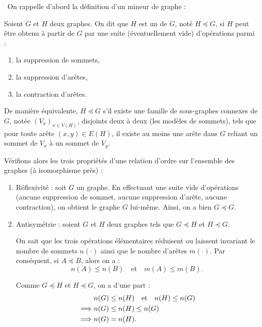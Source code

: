 \begin{td-sol}[]\,
    On rappelle d'abord la d\'efinition d'un mineur de graphe :
    \begin{definition}
        Soient \(G\) et \(H\) deux graphes. On dit que \(H\) est un  de \(G\), not\'e \(H \preccurlyeq G\), si \(H\) peut \^etre obtenu à partir de \(G\) par une suite (éventuellement vide) d'opérations parmi :
        \begin{enumerate}[label=\roman*)]
            \item la suppression de sommets,
            \item la suppression d'arêtes,
            \item la contraction d'arêtes.
        \end{enumerate}
    \end{definition}
    \vspace{2mm}

    De mani\`ere équivalente, \(H \preccurlyeq G\) s'il existe une famille de sous-graphes connexes de \(G\), not\'ee \((V_x)_{x \in V(H)}\), disjoints deux à deux (les modèles de sommets), tels que pour toute arête \((x, y) \in E(H)\), il existe au moins une arête dans \(G\) reliant un sommet de \(V_x\) à un sommet de \(V_y\).

    V\'erifions alors les trois propri\'et\'es d'une relation d'ordre sur l'ensemble des graphes (à isomorphisme pr\`es) :

    \begin{enumerate}
        \item R\'eflexivit\'e : soit \(G\) un graphe.
        En effectuant une suite vide d'opérations (aucune suppression de sommet, aucune suppression d'arête, aucune contraction), on obtient le graphe \(G\) lui-même.
        Ainsi, on a bien \(G \preccurlyeq G\).

        \item Antisym\'etrie : soient \(G\) et \(H\) deux graphes tels que \(G \preccurlyeq H\) et \(H \preccurlyeq G\).
        
        On sait que les trois opérations élémentaires réduisent ou laissent invariant le nombre de sommets \(n(\cdot)\) ainsi que le nombre d'arêtes \(m(\cdot)\).
        Par conséquent, si \(A \preccurlyeq B\), alors on a :
        \begin{equation*}
            n(A) \leq n(B) \quad \text{et} \quad m(A) \leq m(B).
        \end{equation*}

        Comme \(G \preccurlyeq H\) et \(H \preccurlyeq G\), on a d'une part :
        \begin{equation*}
            \begin{aligned}
                \hphantom{\implies} & n(G) \leq n(H) \quad \text{et} \quad n(H) \leq n(G) \\
                \implies & n(G) \leq n(H) \leq n(G) \\
                \implies & n(G) = n(H).
            \end{aligned}
        \end{equation*}


\end{enumerate}
\end{td-sol}
